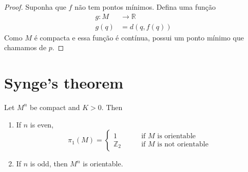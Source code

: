 \begin{proof}
Suponha que $f$ não tem pontos mínimos. Defina uma função
\begin{align*}
	g: M &\longrightarrow \mathbb{R} \\
	g(q) &=d(q,f(q)) 
\end{align*}
Como $M$ é compacta e essa função é contínua, possui um ponto mínimo que
chamamos de $p$. 
\end{proof}

\section{Synge's theorem}
\label{section-Synge-theorem}

\begin{theorem}[Synge]
\label{theorem-Synge}
Let $M^n$ be compact and $K>0$. Then
\begin{enumerate}
\item If $n$ is even,
$$
\pi_1(M)=\begin{cases}
	1\qquad & \text{if $M$ is orientable}\\
	\mathbb{Z}_2\qquad & \text{if $M$ is not orientable}
\end{cases}
$$
\item If $n$ is odd, then $M^n$ is orientable.
\end{enumerate}
\end{theorem}

